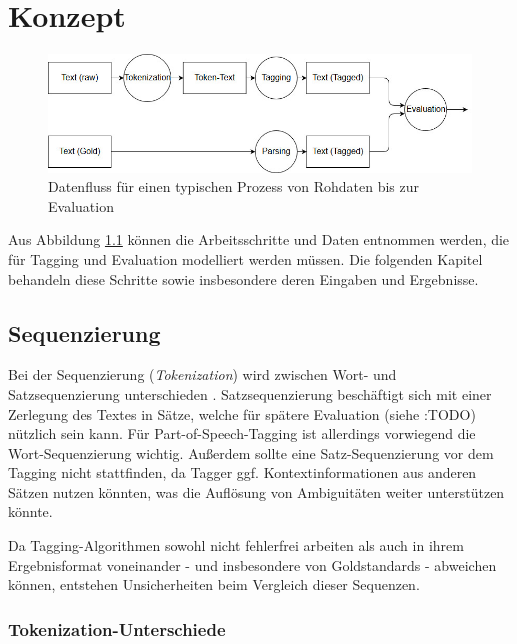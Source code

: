 %
\chapter{Konzept}
\label{sec:concept}



\begin{figure}[htb]
	\includegraphics[width=\textwidth]{gfx/Dataflow_concept.jpg}
	\caption{Datenfluss für einen typischen Prozess von Rohdaten bis zur Evaluation}
	\label{fig:concept:overview}
\end{figure}

Aus Abbildung \ref{fig:concept:overview} können die Arbeitsschritte und Daten entnommen werden, die für Tagging und Evaluation modelliert werden müssen. Die folgenden Kapitel behandeln diese Schritte sowie insbesondere deren Eingaben und Ergebnisse.

\section{Sequenzierung}
\label{sec:concept:sequence}
Bei der Sequenzierung (\textit{Tokenization}) wird zwischen Wort- und Satzsequenzierung unterschieden \cite{Smith}. Satzsequenzierung beschäftigt sich mit einer Zerlegung des Textes in Sätze, welche für spätere Evaluation (siehe :TODO) nützlich sein kann. Für Part-of-Speech-Tagging ist allerdings vorwiegend die Wort-Sequenzierung wichtig. Außerdem sollte eine Satz-Sequenzierung vor dem Tagging nicht stattfinden, da Tagger ggf. Kontextinformationen aus anderen Sätzen nutzen könnten, was die Auflösung von Ambiguitäten weiter unterstützen könnte.

Da Tagging-Algorithmen sowohl nicht fehlerfrei arbeiten als auch in ihrem Ergebnisformat voneinander - und insbesondere von Goldstandards - abweichen können, entstehen Unsicherheiten beim Vergleich dieser Sequenzen. 

\subsection{Tokenization-Unterschiede}
\label{sec:concept:sequence:tok}

